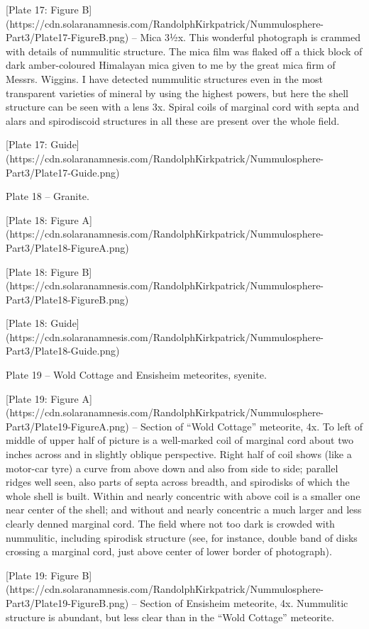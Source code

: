 \documentclass[a4paper, 12pt, oneside]{article}
\begin{document}
[Plate 17: Figure B](https://cdn.solaranamnesis.com/RandolphKirkpatrick/Nummulosphere-Part3/Plate17-FigureB.png) -- Mica 3½x. This wonderful photograph is crammed with details of nummulitic structure. The mica film was flaked off a thick block of dark amber-coloured Himalayan mica given to me by the great mica firm of Messrs. Wiggins. I have detected nummulitic structures even in the most transparent varieties of mineral by using the highest powers, but here the shell structure can be seen with a lens 3x. Spiral coils of marginal cord with septa and alars and spirodiscoid structures in all these are present over the whole field.

[Plate 17: Guide](https://cdn.solaranamnesis.com/RandolphKirkpatrick/Nummulosphere-Part3/Plate17-Guide.png)

Plate 18 -- Granite.

[Plate 18: Figure A](https://cdn.solaranamnesis.com/RandolphKirkpatrick/Nummulosphere-Part3/Plate18-FigureA.png)

[Plate 18: Figure B](https://cdn.solaranamnesis.com/RandolphKirkpatrick/Nummulosphere-Part3/Plate18-FigureB.png)

[Plate 18: Guide](https://cdn.solaranamnesis.com/RandolphKirkpatrick/Nummulosphere-Part3/Plate18-Guide.png)

Plate 19 -- Wold Cottage and Ensisheim meteorites, syenite.

[Plate 19: Figure A](https://cdn.solaranamnesis.com/RandolphKirkpatrick/Nummulosphere-Part3/Plate19-FigureA.png) -- Section of ``Wold Cottage'' meteorite, 4x. To left of middle of upper half of picture is a well-marked coil of marginal cord about two inches across and in slightly oblique perspective. Right half of coil shows (like a motor-car tyre) a curve from above down and also from side to side; parallel ridges well seen, also parts of septa across breadth, and spirodisks of which the whole shell is built. Within and nearly concentric with above coil is a smaller one near center of the shell; and without and nearly concentric a much larger and less clearly denned marginal cord. The field where not too dark is crowded with nummulitic, including spirodisk structure (see, for instance, double band of disks crossing a marginal cord, just above center of lower border of photograph).

[Plate 19: Figure B](https://cdn.solaranamnesis.com/RandolphKirkpatrick/Nummulosphere-Part3/Plate19-FigureB.png) -- Section of Ensisheim meteorite, 4x. Nummulitic structure is abundant, but less clear than in the ``Wold Cottage'' meteorite.
\end{document}
